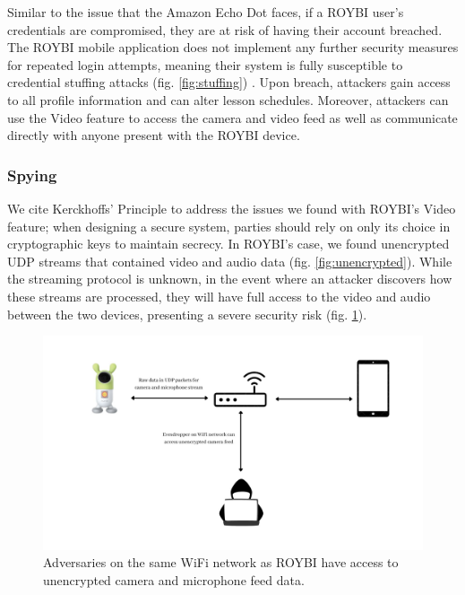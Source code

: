 \documentclass[12pt]{ucthesis}
\begin{document}
Similar to the issue that the Amazon Echo Dot faces, if a ROYBI user's credentials are compromised, they are at risk of having their account breached. The ROYBI mobile application does not implement any further security measures for repeated login attempts, meaning their system is fully susceptible to credential stuffing attacks (fig. \ref{fig:stuffing}) \cite{stuffing}. Upon breach, attackers gain access to all profile information and can alter lesson schedules. Moreover, attackers can use the Video feature to access the camera and video feed as well as communicate directly with anyone present with the ROYBI device.

\subsubsection{Spying}
We cite Kerckhoffs' Principle \cite{kerckhoffs} to address the issues we found with ROYBI's Video feature; when designing a secure system, parties should rely on only its choice in cryptographic keys to maintain secrecy. In ROYBI's case, we found unencrypted UDP streams that contained video and audio data (fig. \ref{fig:unencrypted}). While the streaming protocol is unknown, in the event where an attacker discovers how these streams are processed, they will have full access to the video and audio between the two devices, presenting a severe security risk (fig. \ref{fig:evesdropper}).

\begin{figure}
    \includegraphics[width=\textwidth]{evesdropper.jpg}
    \caption{Adversaries on the same WiFi network as ROYBI have access to unencrypted camera and microphone feed data.}
    \label{fig:evesdropper}
\end{figure}
\end{document}
